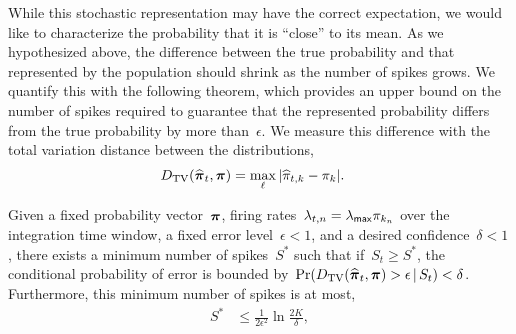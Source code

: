 While this stochastic representation may have the correct expectation, we
would like to characterize the probability that it is ``close'' to its
mean. As we hypothesized above, the difference between the true
probability and that represented by the population should shrink as
the number of spikes grows. We quantify this with the following
theorem, which provides an upper bound on the number of spikes
required to guarantee that the represented probability differs from
the true probability by more than~$\epsilon$. We measure this
difference with the total variation distance between the
distributions,
\begin{align*}
  {D_{\mathrm{TV}}}(\widehat{\boldsymbol{\pi}}_t, \boldsymbol{\pi}) &= 
  \max_{\ell} |\widehat{\pi}_{t,k} - \pi_{k}|.
\end{align*}

\begin{theorem}
\label{thm:fixed_count}
Given a fixed probability vector~$\boldsymbol{\pi}$, firing
rates~$\lambda_{t,n} = \lambda_{\mathsf{max}} \pi_{k_n}$ over the integration
time window, a fixed error level~$\epsilon < 1$, and a desired
confidence~$\delta < 1$, there exists a minimum number of spikes~$S^*$
such that if~$S_t \geq S^*$, the conditional probability of error is
bounded
by~$\Pr({D_{\mathrm{TV}}}(\widehat{\boldsymbol{\pi}}_t, \boldsymbol{\pi}) > \epsilon \,|\, S_t) <
\delta$.  Furthermore, this minimum number of spikes is at most,
\begin{align*}
S^* &\leq \frac{1}{2\epsilon^2} \ln \frac{2K}{\delta},  
\end{align*}
\end{theorem}

